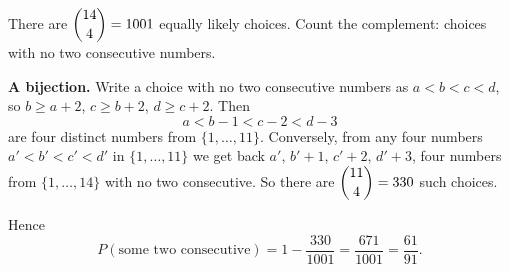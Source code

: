 There are $\dbinom{14}{4}=1001$ equally likely choices. Count the complement: choices with no two consecutive numbers.

\textbf{A bijection.} Write a choice with no two consecutive numbers as $a<b<c<d$, so $b\ge a+2$, $c\ge b+2$, $d\ge c+2$. Then
\[
a<b-1<c-2<d-3
\]
are four distinct numbers from $\{1,\dots,11\}$. Conversely, from any four numbers $a'<b'<c'<d'$ in $\{1,\dots,11\}$ we get back $a',\,b'+1,\,c'+2,\,d'+3$, four numbers from $\{1,\dots,14\}$ with no two consecutive. So there are $\dbinom{11}{4}=330$ such choices.

Hence
\[
P(\text{some two consecutive})=1-\dfrac{330}{1001}=\dfrac{671}{1001}=\boxed{\dfrac{61}{91}}.
\]
